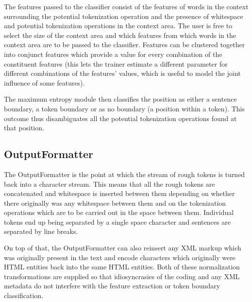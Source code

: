 The features passed to the classifier consist of the features of words
in the context surrounding the potential tokenization operation and
the presence of whitespace and potential tokenization operations in
the context area. The user is free to select the size of the context
area and which features from which words in the context area are to be
passed to the classifier. Features can be clustered together into
conjunct features which provide a value for every combination of the
constituent features (this lets the trainer estimate a different
parameter for different combinations of the features' values, which is
useful to model the joint influence of some features).

The maximum entropy module then classifies the position as either a
sentence boundary, a token boundary or as no boundary (a position
within a token). This outcome thus disambiguates all the potential
tokenization operations found at that position.

\subsection{OutputFormatter}

The OutputFormatter is the point at which the stream of rough tokens
is turned back into a character stream. This means that all the rough
tokens are concatenated and whitespace is inserted between them
depending on whether there originally was any whitespace between them
and on the tokenization operations which are to be carried out in the
space between them. Individual tokens end up being separated by a
single space character and sentences are separated by line breaks.

On top of that, the OutputFormatter can also reinsert any XML markup
which was originally present in the text and encode characters which
originally were HTML entities back into the same HTML entities. Both
of these normalization transformations are supplied so that
idiosyncrasies of the coding and any XML metadata do not interfere
with the feature extraction or token boundary classification.
